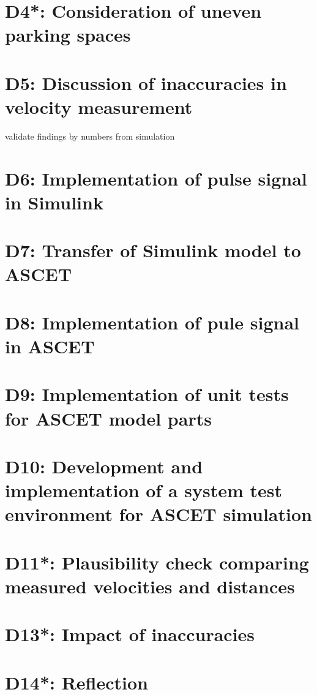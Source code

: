 \chapter{D4*: Consideration of uneven parking spaces}\label{cha:D4}

\chapter{D5: Discussion of inaccuracies in velocity measurement}\label{cha:D5}
validate findings by numbers from simulation

\chapter{D6: Implementation of pulse signal in Simulink}\label{cha:D6}

\chapter{D7: Transfer of Simulink model to ASCET}\label{cha:D7}

\chapter{D8: Implementation of pule signal in ASCET}\label{cha:D8}

\chapter{D9: Implementation of unit tests for ASCET model parts}\label{cha:D9}

\chapter{D10: Development and implementation of a system test environment for ASCET simulation}\label{cha:D10}

\chapter{D11*: Plausibility check comparing measured velocities and distances}\label{cha:D11}

\chapter{D13*: Impact of inaccuracies}\label{cha:D13}

\chapter{D14*: Reflection}\label{cha:D14}